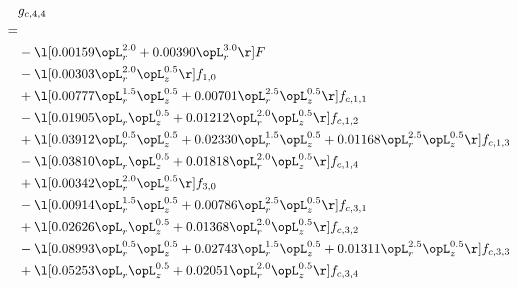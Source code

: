 \begin{alignat}{2} 
\label{eq:g_44_0} 
& g_{c,4,4} \nonumber \\ 
 = \\ 
& - \l[  0.00159 \opL_r^{2.0} +  0.00390 \opL_r^{3.0}  \r] F \nonumber \\ 
& - \l[  0.00303 \opL_r^{2.0} \opL_z^{0.5}  \r] f_{1,0} \nonumber \\ 
& + \l[  0.00777 \opL_r^{1.5} \opL_z^{0.5} +  0.00701 \opL_r^{2.5} \opL_z^{0.5}  \r] f_{c,1,1} \nonumber \\ 
& - \l[  0.01905 \opL_r \opL_z^{0.5} +  0.01212 \opL_r^{2.0} \opL_z^{0.5}  \r] f_{c,1,2} \nonumber \\ 
& + \l[  0.03912 \opL_r^{0.5} \opL_z^{0.5} +  0.02330 \opL_r^{1.5} \opL_z^{0.5} +  0.01168 \opL_r^{2.5} \opL_z^{0.5}  \r] f_{c,1,3} \nonumber \\ 
& - \l[  0.03810 \opL_r \opL_z^{0.5} +  0.01818 \opL_r^{2.0} \opL_z^{0.5}  \r] f_{c,1,4} \nonumber \\ 
& + \l[  0.00342 \opL_r^{2.0} \opL_z^{0.5}  \r] f_{3,0} \nonumber \\ 
& - \l[  0.00914 \opL_r^{1.5} \opL_z^{0.5} +  0.00786 \opL_r^{2.5} \opL_z^{0.5}  \r] f_{c,3,1} \nonumber \\ 
& + \l[  0.02626 \opL_r \opL_z^{0.5} +  0.01368 \opL_r^{2.0} \opL_z^{0.5}  \r] f_{c,3,2} \nonumber \\ 
& - \l[  0.08993 \opL_r^{0.5} \opL_z^{0.5} +  0.02743 \opL_r^{1.5} \opL_z^{0.5} +  0.01311 \opL_r^{2.5} \opL_z^{0.5}  \r] f_{c,3,3} \nonumber \\ 
& + \l[  0.05253 \opL_r \opL_z^{0.5} +  0.02051 \opL_r^{2.0} \opL_z^{0.5}  \r] f_{c,3,4} \nonumber \\ 
\end{alignat} 


